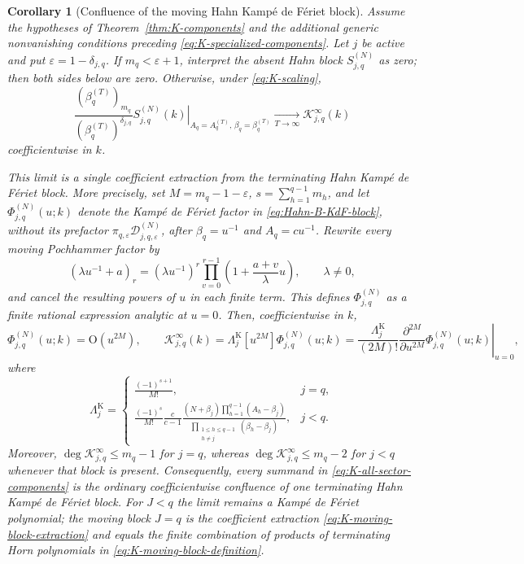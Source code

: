 \documentclass[10pt]{amsart}
\theoremstyle{plain}
\newtheorem{corollary}[theorem]{Corollary}
\theoremstyle{definition}
\theoremstyle{remark}
\begin{document}
\begin{corollary}[Confluence of the moving Hahn Kamp\'e de F\'eriet block]
\label{cor:K-moving-KdF-block}
Assume the hypotheses of Theorem~\ref{thm:K-components} and the
additional generic nonvanishing conditions preceding
\eqref{eq:K-specialized-components}.  Let \(j\) be active and put
\(\varepsilon=1-\delta_{j,q}\).  If
\(m_q<\varepsilon+1\), interpret the absent Hahn block
\(S_{j,q}^{(N)}\) as zero; then both sides below are zero.  Otherwise,
under \eqref{eq:K-scaling},
\begin{equation}
 \frac{(\beta_q^{(T)})_{m_q}}
      {(\beta_q^{(T)})^{\delta_{j,q}}}
 \left.S_{j,q}^{(N)}(k)\right|_{
 A_q=A_q^{(T)},\,\beta_q=\beta_q^{(T)}}
 \xrightarrow[T\to\infty]{}
 \mathscr K_{j,q}^{\infty}(k)
 \label{eq:Hahn-K-moving-block-limit}
\end{equation}
coefficientwise in \(k\).

This limit is a single coefficient extraction from the terminating Hahn
Kamp\'e de F\'eriet block.  More precisely, set
\(M=m_q-1-\varepsilon\), \(s=\sum_{h=1}^{q-1}m_h\), and let
\(\Phi_{j,q}^{(N)}(u;k)\) denote the Kamp\'e de F\'eriet factor in
\eqref{eq:Hahn-B-KdF-block}, without its prefactor
\(\pi_{q,\varepsilon}\mathcal D_{j,q,\varepsilon}^{(N)}\), after
\(\beta_q=u^{-1}\) and \(A_q=cu^{-1}\).  Rewrite every moving
Pochhammer factor by
\[
 (\lambda u^{-1}+a)_r
 =(\lambda u^{-1})^r
  \prod_{v=0}^{r-1}\left(1+\frac{a+v}{\lambda}u\right),
 \qquad \lambda\ne0,
\]
and cancel the resulting powers of \(u\) in each finite term.  This
defines \(\Phi_{j,q}^{(N)}\) as a finite rational expression analytic at
\(u=0\).  Then, coefficientwise in \(k\),
\begin{equation}
 \Phi_{j,q}^{(N)}(u;k)=\mathrm O(u^{2M}),
 \qquad
 \mathscr K_{j,q}^{\infty}(k)
 =\Lambda_j^{\mathrm K}[u^{2M}]\Phi_{j,q}^{(N)}(u;k)
 =\frac{\Lambda_j^{\mathrm K}}{(2M)!}
   \left.\frac{\partial^{2M}}{\partial u^{2M}}
   \Phi_{j,q}^{(N)}(u;k)\right|_{u=0},
 \label{eq:K-moving-block-extraction}
\end{equation}
where
\begin{equation}
 \Lambda_j^{\mathrm K}=
 \begin{cases}
 \displaystyle \frac{(-1)^{s+1}}{M!},&j=q,\\[6pt]
 \displaystyle \frac{(-1)^s}{M!}\frac{c}{c-1}
 \frac{(N+\beta_j)\prod_{h=1}^{q-1}(A_h-\beta_j)}
 {\prod_{\substack{1\le h\le q-1\\h\ne j}}
  (\beta_h-\beta_j)},&j<q.
 \end{cases}
 \label{eq:K-moving-block-prefactor}
\end{equation}
Moreover,
\(\deg\mathscr K_{j,q}^{\infty}\le m_q-1\) for \(j=q\), whereas
\(\deg\mathscr K_{j,q}^{\infty}\le m_q-2\) for \(j<q\) whenever that
block is present.
Consequently, every summand in \eqref{eq:K-all-sector-components} is the
ordinary coefficientwise confluence of one terminating Hahn Kamp\'e de
F\'eriet block.  For \(J<q\) the limit remains a Kamp\'e de F\'eriet
polynomial; the moving block \(J=q\) is the coefficient extraction
\eqref{eq:K-moving-block-extraction} and equals the finite combination
of products of terminating Horn polynomials in
\eqref{eq:K-moving-block-definition}.
\end{corollary}
\end{document}
